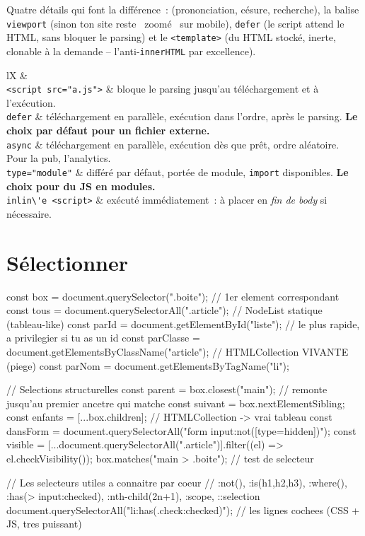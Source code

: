 Quatre d\'etails qui font la diff\'erence~:  (prononciation, c\'esure, recherche),
la balise \verb|viewport| (sinon ton site reste \og ~zoom\'e~ \fg{} sur mobile), \verb|defer|
(le script attend le HTML, sans bloquer le parsing) et le \verb|<template>| (du HTML stock\'e,
inerte, clonable \`a la demande -- l'anti-\verb|innerHTML| par excellence).

\begin{tabz}{lX}
  \headrow {} \&  \\
  \midrule
  \verb|<script src="a.js">| \& bloque le parsing jusqu'au t\'el\'echargement et \`a l'ex\'ecution. \\
  \verb|defer| \& t\'el\'echargement en parall\`ele, ex\'ecution dans l'ordre, apr\`es le parsing. \textbf{Le choix par d\'efaut pour un fichier externe.} \\
  \verb|async| \& t\'el\'echargement en parall\`ele, ex\'ecution d\`es que pr\^et, ordre al\'eatoire. Pour la pub, l'analytics. \\
  \verb|type="module"| \& diff\'er\'e par d\'efaut, port\'ee de module, \verb|import| disponibles. \textbf{Le choix pour du JS en modules.} \\
  \verb|inlin\'e <script>| \& ex\'ecut\'e imm\'ediatement~: \`a placer en \emph{fin de body} si n\'ecessaire. \\
\end{tabz}

\section{S\'electionner}

\begin{codejs}
const box = document.querySelector(".boite");       // 1er element correspondant
const tous = document.querySelectorAll(".article");  // NodeList statique (tableau-like)
const parId = document.getElementById("liste");      // le plus rapide, a privilegier si tu as un id
const parClasse = document.getElementsByClassName("article");   // HTMLCollection VIVANTE (piege)
const parNom = document.getElementsByTagName("li");

// Selections structurelles
const parent = box.closest("main");          // remonte jusqu'au premier ancetre qui matche
const suivant = box.nextElementSibling;
const enfants = [...box.children];           // HTMLCollection -> vrai tableau
const dansForm = document.querySelectorAll("form input:not([type=hidden])");
const visible = [...document.querySelectorAll(".article")].filter((el) => el.checkVisibility());
box.matches("main > .boite");                 // test de selecteur

// Les selecteurs utiles a connaitre par coeur
// :not(), :is(h1,h2,h3), :where(), :has(> input:checked), :nth-child(2n+1), :scope, ::selection
document.querySelectorAll("li:has(.check:checked)");     // les lignes cochees (CSS + JS, tres puissant)
\end{codejs}

